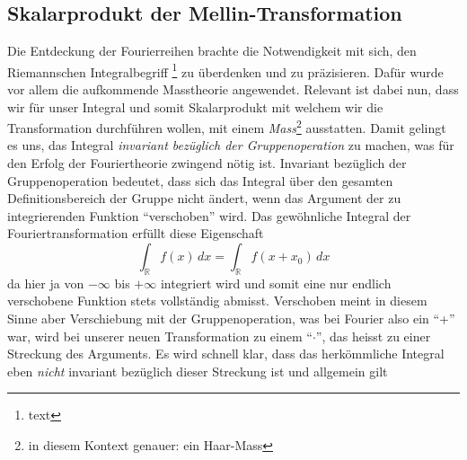 

\subsection{Skalarprodukt der Mellin-Transformation
\label{mellin:subsection:skalarprodukt}}
Die Entdeckung der Fourierreihen brachte die Notwendigkeit mit sich, den Riemannschen Integralbegriff
\footnote{text} zu überdenken und zu präzisieren.
Dafür wurde vor allem die aufkommende Masstheorie angewendet.
Relevant ist dabei nun, dass wir für unser Integral und somit Skalarprodukt mit welchem wir die Transformation durchführen wollen, 
mit einem \emph{Mass}\footnote{in diesem Kontext genauer: ein Haar-Mass} ausstatten. 
Damit gelingt es uns, das Integral \emph{invariant bezüglich der Gruppenoperation} zu machen, was für den Erfolg der Fouriertheorie 
zwingend nötig ist. 
Invariant bezüglich der Gruppenoperation bedeutet, dass sich das Integral über den gesamten Definitionsbereich der Gruppe nicht 
ändert, wenn das Argument der zu integrierenden Funktion ``verschoben'' wird. 
Das gewöhnliche Integral der Fouriertransformation erfüllt diese Eigenschaft 
\begin{equation}
    \int_\mathbb{R} f(x)\,dx = \int_\mathbb{R} f(x + x_0)\,dx
\end{equation}
da hier ja von $-\infty$ bis $+\infty$ integriert wird und somit eine nur endlich verschobene Funktion stets vollständig abmisst.
Verschoben meint in diesem Sinne aber Verschiebung mit der Gruppenoperation, was bei Fourier also ein ``+'' war, wird bei unserer 
neuen Transformation zu einem ``$\cdot$'', das heisst zu einer Streckung des Arguments. 
Es wird schnell klar, dass das herkömmliche Integral eben \emph{nicht} invariant bezüglich dieser Streckung ist und allgemein gilt 
